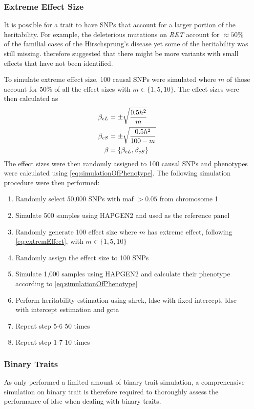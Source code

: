 \documentclass[12pt]{scrbook}
\begin{document}
\subsubsection{Extreme Effect Size}
\label{sec:extremeEffectSim}
It is possible for a trait to have \glspl{SNP} that account for a larger portion of the heritability.
For example, the deleterious mutations on \textit{RET} account for $\approx50\%$ of the familial cases of the Hirschsprung's disease yet some of the heritability was still missing.
\citet{Gui2013} therefore suggested that there might be more variants with small effects that have not been identified.
 
To simulate extreme effect size, 100 causal \glspl{SNP} were simulated where $m$ of those account for 50\% of all the effect sizes with $m\in\{1,5,10\}$.
The effect sizes were then calculated as
\begin{align}
\beta_{eL} &= \pm\sqrt{\frac{0.5h^2}{m}} \notag\\
\beta_{eS} &= \pm\sqrt{\frac{0.5h^2}{100-m}} \notag\\
\beta &= \{\beta_{eL}, \beta_{eS}\}
\label{eq:extremEffect}
\end{align}
The effect sizes were then randomly assigned to 100 causal \glspl{SNP} and phenotypes were calculated using \cref{eq:simulationOfPhenotype}.
The following simulation procedure were then performed:
\begin{enumerate}
	\item Randomly select 50,000 \glspl{SNP} with \gls{maf} $>0.05$ from chromosome 1
	\item Simulate 500 samples using HAPGEN2 and used as the reference panel
	\item Randomly generate 100 effect size where $m$ has extreme effect, following \cref{eq:extremEffect}, with $m\in\{1,5,10\}$
	\item Randomly assign the effect size to 100 \glspl{SNP}
	\item Simulate 1,000 samples using HAPGEN2 and calculate their phenotype according to \cref{eq:simulationOfPhenotype}
	\item Perform heritability estimation using \gls{shrek}, \gls{ldsc} with fixed intercept, \gls{ldsc} with intercept estimation and \gls{gcta}
	\item Repeat step 5-6 50 times
	\item Repeat step 1-7 10 times
\end{enumerate}

\subsubsection{Binary Traits}
As \citet{Bulik-Sullivan2015} only performed a limited amount of binary trait simulation, a comprehensive simulation on binary trait is therefore required to thoroughly assess the performance of \gls{ldsc} when dealing with binary traits.
\end{document}
